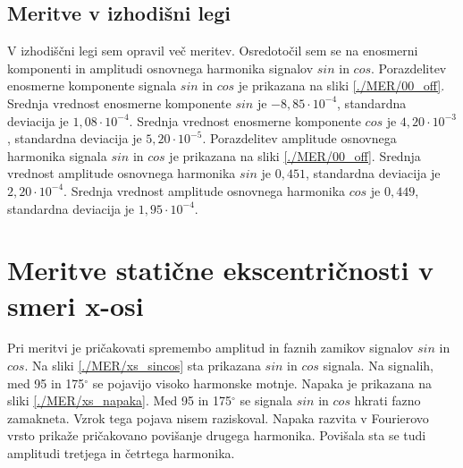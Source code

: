 \subsection{Meritve v izhodišni legi}
V izhodiščni legi sem opravil več meritev. Osredotočil sem se na enosmerni komponenti  in amplitudi osnovnega harmonika signalov $sin$ in $cos$. 
Porazdelitev enosmerne komponente signala $sin$ in $cos$ je prikazana na sliki \ref{./MER/00_off}.
Srednja vrednost enosmerne komponente $sin$ je $-8,85 \cdot 10^{-4}$, standardna deviacija je $1,08\cdot 10^{-4}$.
Srednja vrednost enosmerne komponente $cos$ je $4,20 \cdot 10^{-3}$, standardna deviacija je $5,20\cdot 10^{-5}$.
Porazdelitev amplitude osnovnega harmonika signala $sin$ in $cos$ je prikazana na sliki \ref{./MER/00_off}.
Srednja vrednost amplitude osnovnega harmonika $sin$ je $0,451$, standardna deviacija je $2,20\cdot 10^{-4}$.
Srednja vrednost amplitude osnovnega harmonika $cos$ je $0,449$, standardna deviacija je $1,95\cdot 10^{-4}$.
\newpage
\section{Meritve statične ekscentričnosti v smeri x-osi}
Pri meritvi je pričakovati spremembo amplitud in faznih zamikov signalov $sin$ in $cos$. Na sliki \ref{./MER/xs_sincos} sta prikazana $sin$ in $cos$ signala. Na signalih, med 95 in 175$^\circ$ se pojavijo visoko harmonske motnje.
Napaka je prikazana na sliki \ref{./MER/xs_napaka}. Med 95 in 175$^\circ$ se signala $sin$ in $cos$ hkrati fazno zamakneta. Vzrok tega pojava nisem raziskoval. Napaka razvita v Fourierovo vrsto prikaže pričakovano povišanje drugega harmonika. Povišala sta se tudi amplitudi tretjega in četrtega harmonika.
